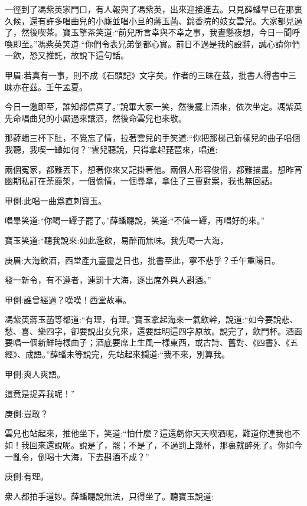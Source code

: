 \begin{parag}
    一徑到了馮紫英家門口，有人報與了馮紫英，出來迎接進去。只見薛蟠早已在那裏久候，還有許多唱曲兒的小廝並唱小旦的蔣玉菡、錦香院的妓女雲兒。大家都見過了，然後喫茶。寶玉擎茶笑道:“前兒所言幸與不幸之事，我晝懸夜想，今日一聞呼喚即至。”馮紫英笑道:“你們令表兄弟倒都心實。前日不過是我的設辭，誠心請你們一飲，恐又推託，故說下這句話。\begin{note}甲眉:若真有一事，則不成《石頭記》文字矣。作者的三昧在茲，批書人得書中三昧亦在茲。壬午孟夏。\end{note}今日一邀即至，誰知都信真了。”說畢大家一笑，然後擺上酒來，依次坐定。馮紫英先命唱曲兒的小廝過來讓酒，然後命雲兒也來敬。
\end{parag}


\begin{parag}
    那薛蟠三杯下肚，不覺忘了情，拉著雲兒的手笑道:“你把那梯己新樣兒的曲子唱個我聽，我喫一罈如何？”雲兒聽說，只得拿起琵琶來，唱道:
\end{parag}


\begin{parag}
    兩個寃家，都難丟下，想著你來又記掛著他。兩個人形容俊俏，都難描畫。想昨宵幽期私訂在荼蘼架，一個偷情，一個尋拿，拿住了三曹對案，我也無回話。\begin{note}甲側:此唱一曲爲直刺寶玉。\end{note}
\end{parag}


\begin{parag}
    唱畢笑道:“你喝一罈子罷了。”薛蟠聽說，笑道:“不值一罈，再唱好的來。”
\end{parag}


\begin{parag}
    寶玉笑道:“聽我說來:如此濫飲，易醉而無味。我先喝一大海，\begin{note}庚眉:大海飲酒，西堂產九臺靈芝日也，批書至此，寧不悲乎？壬午重陽日。\end{note}發一新令，有不遵者，連罰十大海，逐出席外與人斟酒。”\begin{note}甲側:誰曾經過？嘆嘆！西堂故事。\end{note}馮紫英蔣玉菡等都道:“有理，有理。”寶玉拿起海來一氣飲幹，說道:“如今要說悲、愁、喜、樂四字，卻要說出女兒來，還要註明這四字原故。說完了，飲門杯。酒面要唱一個新鮮時樣曲子；酒底要席上生風一樣東西，或古詩、舊對、《四書》、《五經》、成語。”薛蟠未等說完，先站起來攔道:“我不來，別算我。\begin{note}甲側:爽人爽語。\end{note}這竟是捉弄我呢！”\begin{note}庚側:豈敢？\end{note}雲兒也站起來，推他坐下，笑道:“怕什麼？這還虧你天天喫酒呢，難道你連我也不如！我回來還說呢。說是了，罷；不是了，不過罰上幾杯，那裏就醉死了。你如今一亂令，倒喝十大海，下去斟酒不成？”\begin{note}庚側:有理。\end{note}衆人都拍手道妙。薛蟠聽說無法，只得坐了。聽寶玉說道:
\end{parag}


